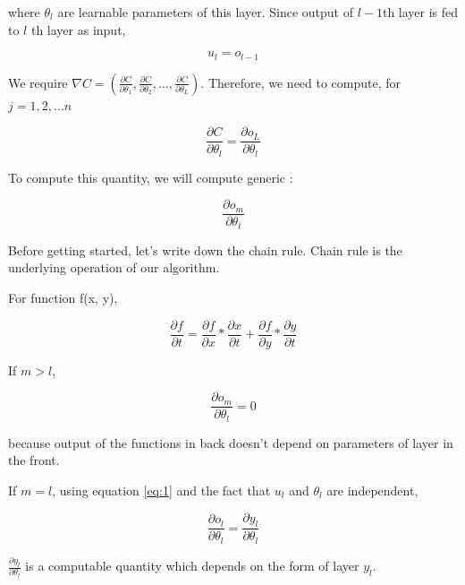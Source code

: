 \documentclass[a4paper]{tufte-handout}
\begin{document}
where \(\theta_l\) are learnable parameters of this layer. Since output
of \(l-1\)th layer is fed to \(l\) th layer as input,


\begin{equation}
u_l = o_{l-1} \label{eq:2}
\end{equation}


We require
\(\nabla C = \left(\frac{\partial C}{\partial\theta_1}, \frac{\partial C}{\partial\theta_2}, \ldots, \frac{\partial C}{\partial\theta_L}\right)\).
Therefore, we need to compute, for  \( j = 1, 2, \dots n \)

\[ \frac{\partial C}{\partial\theta_l} = \frac{\partial o_L}{\partial\theta_l} \]


To compute this quantity, we will compute generic
:

\[ \frac{\partial o_m}{\partial \theta_l} \]

Before getting started, let's write down the chain rule. Chain rule is
the underlying operation of our algorithm.

\begin{framed}
For function f(x, y), 

\begin{equation}
\frac{\partial f}{\partial t} = \frac{\partial f}{\partial x} * \frac{\partial x}{\partial t} + \frac{\partial f}{\partial y} * \frac{\partial y}{\partial t}
\label{eq:3}
\end{equation}

\end{framed}

If \(m > l\),

\begin{equation}
\frac{\partial o_m}{\partial \theta_l} = 0 \label{eq:4}
\end{equation}


because output of the functions in back doesn't depend on parameters of
layer in the front.

If \(m = l\), using equation \eqref{eq:1} and the fact that \(u_l\) and
\(\theta_l\) are independent,

\begin{equation}
\frac{\partial o_l}{\partial \theta_l} = \frac{\partial y_l}{\partial \theta_l}
\label{eq:5}
\end{equation}

\(\frac{\partial y_l}{\partial \theta_l}\) is a computable quantity
which depends on the form of layer \(y_l\).
\end{document}
